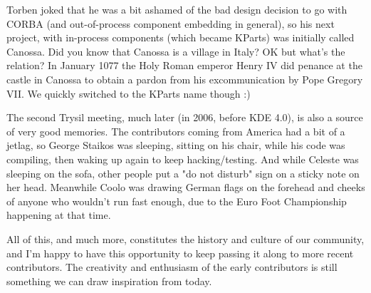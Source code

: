 Torben joked that he was a bit ashamed of the bad design decision to go with CORBA (and out-of-process component embedding in general), so his next project, with in-process components (which became KParts) was initially called Canossa. Did you know that Canossa is a village in Italy? OK but what's the relation? In January 1077 the Holy Roman emperor Henry IV did penance at the castle in Canossa to obtain a pardon from his excommunication by Pope Gregory VII. We quickly switched to the KParts name though :)

The second Trysil meeting, much later (in 2006, before KDE 4.0), is also a source of very good memories. The contributors coming from America had a bit of a jetlag, so George Staikos was sleeping, sitting on his chair, while his code was compiling, then waking up again to keep hacking/testing. And while Celeste was sleeping on the sofa, other people put a "do not disturb" sign on a sticky note on her head. Meanwhile Coolo was drawing German flags on the forehead and cheeks of anyone who wouldn't run fast enough, due to the Euro Foot Championship happening at that time.

All of this, and much more, constitutes the history and culture of our community, and I'm happy to have this opportunity to keep passing it along to more recent contributors. The creativity and enthusiasm of the early contributors is still something we can draw inspiration from today.
